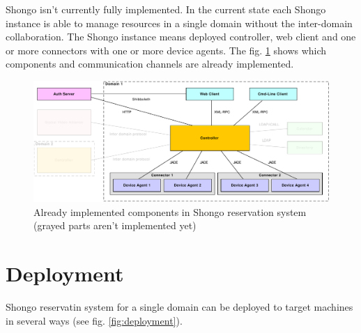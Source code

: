 Shongo isn't currently fully implemented. In the current state each Shongo instance is able to manage resources in a single domain without the inter-domain collaboration. The Shongo instance means deployed controller, web client and one or more connectors with one or more device agents. The fig. \ref{fig:architecture-implemented} shows which components and communication channels are already implemented.

\begin{figure}[ht!]
\includegraphics[width=\textwidth]{diagrams/dd_architecture_implemented}
\caption{Already implemented components in Shongo reservation system (grayed parts aren't implemented yet)}
\label{fig:architecture-implemented}
\end{figure}



\chapter{Deployment}

Shongo reservatin system for a single domain can be deployed to target machines in several ways (see fig. \ref{fig:deployment}).

